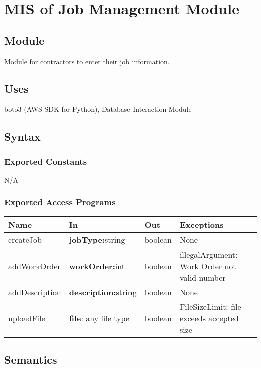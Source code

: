 \documentclass[12pt, titlepage]{article}
\begin{document}
\section{MIS of Job Management Module} \label{Module}

\subsection{Module}

Module for contractors to enter their job information.

\subsection{Uses}
boto3 (AWS SDK for Python), Database Interaction Module
\subsection{Syntax}

\subsubsection{Exported Constants}
N/A
\subsubsection{Exported Access Programs}

\begin{center}
  \begin{tabular}{p{3cm} p{4cm} p{2cm} p{3cm}}
    \hline
    \textbf{Name} & \textbf{In} & \textbf{Out} & \textbf{Exceptions} \\
    \hline
    createJob & \textbf{jobType:}string & boolean & None \\
    addWorkOrder & \textbf{workOrder:}int & boolean &
    illegalArgument: Work Order not valid number \\
    addDescription & \textbf{description:}string & boolean & None \\
    uploadFile & \textbf{file}: any file type & boolean &
    FileSizeLimit: file exceeds accepted size\\
    \hline
  \end{tabular}
\end{center}

\subsection{Semantics}
\end{document}
